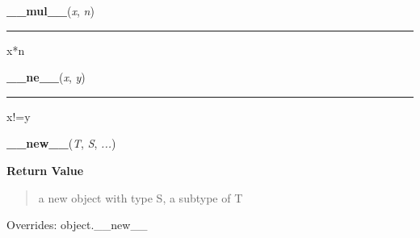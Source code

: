     \label{resource:struct_rusage:__mul__}

    \vspace{0.5ex}

\hspace{.8\funcindent}\begin{boxedminipage}{\funcwidth}

    \raggedright \textbf{\_\_mul\_\_}(\textit{x}, \textit{n})

    \vspace{-1.5ex}

    \rule{\textwidth}{0.5\fboxrule}
\setlength{\parskip}{2ex}
    x*n

\setlength{\parskip}{1ex}
    \end{boxedminipage}

    \label{resource:struct_rusage:__ne__}

    \vspace{0.5ex}

\hspace{.8\funcindent}\begin{boxedminipage}{\funcwidth}

    \raggedright \textbf{\_\_ne\_\_}(\textit{x}, \textit{y})

    \vspace{-1.5ex}

    \rule{\textwidth}{0.5\fboxrule}
\setlength{\parskip}{2ex}
    x!=y

\setlength{\parskip}{1ex}
    \end{boxedminipage}

    \vspace{0.5ex}

\hspace{.8\funcindent}\begin{boxedminipage}{\funcwidth}

    \raggedright \textbf{\_\_new\_\_}(\textit{T}, \textit{S}, \textit{...})

\setlength{\parskip}{2ex}
\setlength{\parskip}{1ex}
      \textbf{Return Value}
    \vspace{-1ex}

      \begin{quote}
      a new object with type S, a subtype of T

      \end{quote}

      Overrides: object.\_\_new\_\_

    \end{boxedminipage}

